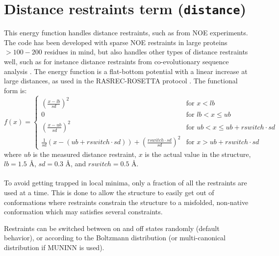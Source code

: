 \section{Distance restraints term (\texttt{distance})}
\label{sec:noe}

This energy function handles distance restraints, such as from NOE experiments.
The code has been developed with sparse NOE restraints in large proteins $> 100-200$ residues in mind, but also handles other types of distance restraints well, such as for instance distance restraints from co-evolutionary sequence analysis \cite{10.7287/peerj.preprints.374v1}.
The energy function is a flat-bottom potential with a linear increase at large distances, as used in the RASREC-ROSETTA protocol \cite{LangePNAS2012}.
The functional form is:
\begin{equation}
   f(x) =
\begin{cases}
\left( \frac{x-lb}{sd} \right)^2        & \text{for } x < lb \\
0                                       & \text{for } lb < x \leq ub \\
\left( \frac{x-ub}{sd} \right)^2        & \text{for } ub < x \leq ub + rswitch \cdot sd \\
\frac{1}{sd}\left(x - \left( ub + rswitch \cdot sd \right) \right) 
+ \left( \frac{rswitch \cdot sd }{sd} \right)^2
                                        & \text{for } x > ub + rswitch \cdot sd
\end{cases}
\end{equation}
where $ub$ is the measured distance restraint, $x$ is the actual value in the structure, 
$lb = 1.5$ \AA, $sd = 0.3$ \AA, and $rswitch = 0.5$ \AA.
\\\\To avoid getting trapped in local minima, only a fraction of all the restraints are used at a time.
This is done to allow the structure to easily get out of conformations where restraints constrain the structure to a misfolded, non-native conformation which may satisfies several constraints.

Restraints can be switched between on and off states randomly (default behavior), or according to the Boltzmann distribution (or multi-canonical distribution if MUNINN is used).

